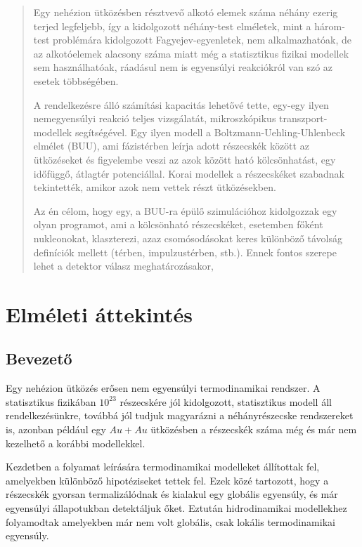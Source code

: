 \documentclass[a4paper,12pt]{article}
\begin{document}
\begin{abstract}
\par Egy nehézion ütközésben résztvevő alkotó elemek száma néhány ezerig terjed legfeljebb, így a kidolgozott néhány-test elméletek, mint a három-test problémára kidolgozott Fagyejev-egyenletek, nem alkalmazhatóak, de az alkotóelemek alacsony száma miatt még a statisztikus fizikai modellek sem használhatóak, ráadásul nem is egyensúlyi reakciókról van szó az esetek többségében.
\par A rendelkezésre álló számítási kapacitás lehetővé tette, egy-egy ilyen nemegyensúlyi reakció teljes vizsgálatát, mikroszkópikus transzport-modellek segítségével. Egy ilyen modell a Boltzmann-Uehling-Uhlenbeck elmélet (BUU), ami fázistérben leírja adott részecskék között az ütközéseket és figyelembe veszi az azok között ható kölcsönhatást, egy időfüggő, átlagtér potenciállal. Korai modellek a részecskéket szabadnak tekintették, amikor azok nem vettek részt ütközésekben.
\par Az én célom, hogy egy, a BUU-ra épülő szimulációhoz kidolgozzak egy olyan programot, ami a kölcsönható részecskéket, esetemben főként nukleonokat, klaszterezi, azaz csomósodásokat keres különböző távolság definíciók mellett (térben, impulzustérben, stb.). Ennek fontos szerepe lehet a detektor válasz meghatározásakor, 
\end{abstract}

\vfill

\newpage
\tableofcontents
\newpage

\section{Elméleti áttekintés}

\subsection{Bevezető}

\par Egy nehézion ütközés erősen nem egyensúlyi termodinamikai rendszer. A statisztikus fizikában $10^{23}$ részecskére jól kidolgozott, statisztikus modell áll rendelkezésünkre, továbbá jól tudjuk magyarázni a néhányrészecske rendszereket is, azonban például egy $Au+Au$ ütközésben a részecskék száma még és már nem kezelhető a korábbi modellekkel.

\par Kezdetben a folyamat leírására termodinamikai modelleket állítottak fel, amelyekben különböző hipotéziseket tettek fel. Ezek közé tartozott, hogy a részecskék gyorsan termalizálódnak és kialakul egy globális egyensúly, és már egyensúlyi állapotukban detektáljuk őket. Eztután hidrodinamikai modellekhez folyamodtak amelyekben már nem volt globális, csak lokális termodinamikai egyensúly.
\end{document}
